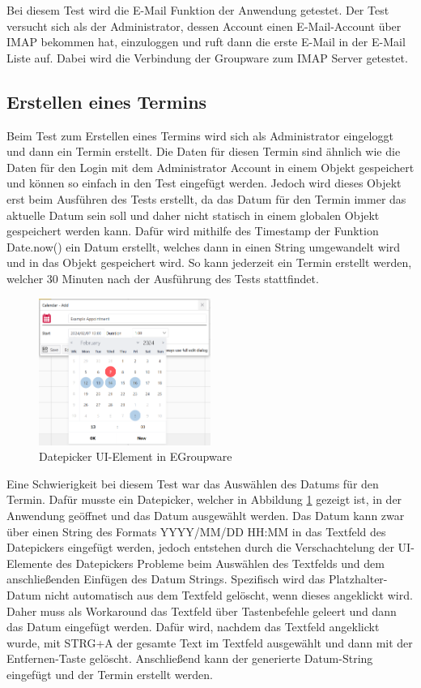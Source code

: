 Bei diesem Test wird die E-Mail Funktion der Anwendung getestet.
Der Test versucht sich als der Administrator, dessen Account einen E-Mail-Account über IMAP bekommen hat, einzuloggen und ruft dann die erste E-Mail in der E-Mail Liste auf.
Dabei wird die Verbindung der Groupware zum IMAP Server getestet.

\subsection*{Erstellen eines Termins}

Beim Test zum Erstellen eines Termins wird sich als Administrator eingeloggt und dann ein Termin erstellt.
Die Daten für diesen Termin sind ähnlich wie die Daten für den Login mit dem Administrator Account in einem Objekt gespeichert und können so einfach in den Test eingefügt werden.
Jedoch wird dieses Objekt erst beim Ausführen des Tests erstellt, da das Datum für den Termin immer das aktuelle Datum sein soll und daher nicht statisch in einem globalen Objekt gespeichert werden kann.
Dafür wird mithilfe des Timestamp der Funktion Date.now() ein Datum erstellt, welches dann in einen String umgewandelt wird und in das Objekt gespeichert wird.
So kann jederzeit ein Termin erstellt werden, welcher 30 Minuten nach der Ausführung des Tests stattfindet.
\begin{figure}[H]
    \centering
    \includegraphics[width=0.5\textwidth]{images/Datepicker.png}
    \caption{Datepicker UI-Element in EGroupware}
    \label{fig:datepicker}
\end{figure}
Eine Schwierigkeit bei diesem Test war das Auswählen des Datums für den Termin.
Dafür musste ein Datepicker, welcher in Abbildung \ref{fig:datepicker} gezeigt ist, in der Anwendung geöffnet und das Datum ausgewählt werden.
Das Datum kann zwar über einen String des Formats YYYY/MM/DD HH:MM in das Textfeld des Datepickers eingefügt werden, jedoch entstehen durch die Verschachtelung der UI-Elemente des Datepickers Probleme beim Auswählen des Textfelds und dem anschließenden Einfügen des Datum Strings.
Spezifisch wird das Platzhalter-Datum nicht automatisch aus dem Textfeld gelöscht, wenn dieses angeklickt wird.
Daher muss als Workaround das Textfeld über Tastenbefehle geleert und dann das Datum eingefügt werden.
Dafür wird, nachdem das Textfeld angeklickt wurde, mit STRG+A der gesamte Text im Textfeld ausgewählt und dann mit der Entfernen-Taste gelöscht.
Anschließend kann der generierte Datum-String eingefügt und der Termin erstellt werden.

